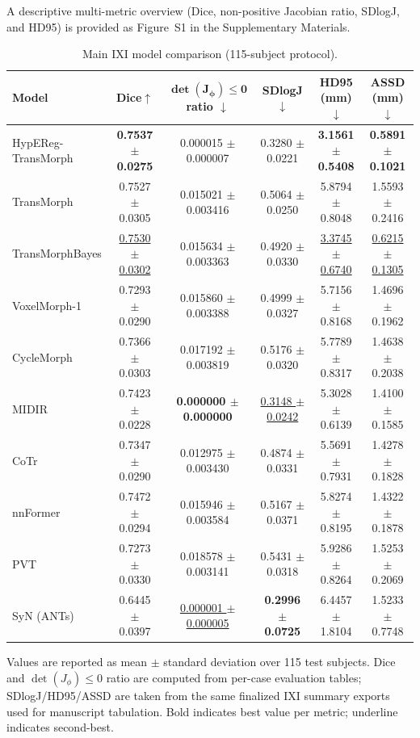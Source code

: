 \documentclass[jimaging,article,submit,pdftex,moreauthors]{Definitions/mdpi}
\begin{document}
\noindent A descriptive multi-metric overview (Dice, non-positive Jacobian ratio, SDlogJ, and HD95) is provided as Figure~S1 in the Supplementary Materials.

\begin{table}[H]
\caption{Main IXI model comparison (115-subject protocol).\label{tab2}}
\centering
\scriptsize
\setlength{\tabcolsep}{3pt}
\begin{tabularx}{\textwidth}{lccccc}
\toprule
\textbf{Model} & \textbf{Dice\(\uparrow\)} & \(\boldsymbol{\det(J_\phi)\le 0}\) \textbf{ratio \(\downarrow\)} & \textbf{SDlogJ\(\downarrow\)} & \textbf{HD95 (mm)\(\downarrow\)} & \textbf{ASSD (mm)\(\downarrow\)}\\
\midrule
HypEReg-TransMorph & \textbf{0.7537 \(\pm\) 0.0275} & 0.000015 \(\pm\) 0.000007 & 0.3280 \(\pm\) 0.0221 & \textbf{3.1561 \(\pm\) 0.5408} & \textbf{0.5891 \(\pm\) 0.1021}\\
TransMorph & 0.7527 \(\pm\) 0.0305 & 0.015021 \(\pm\) 0.003416 & 0.5064 \(\pm\) 0.0250 & 5.8794 \(\pm\) 0.8048 & 1.5593 \(\pm\) 0.2416\\
TransMorphBayes & \underline{0.7530 \(\pm\) 0.0302} & 0.015634 \(\pm\) 0.003363 & 0.4920 \(\pm\) 0.0330 & \underline{3.3745 \(\pm\) 0.6740} & \underline{0.6215 \(\pm\) 0.1305}\\
VoxelMorph-1 & 0.7293 \(\pm\) 0.0290 & 0.015860 \(\pm\) 0.003388 & 0.4999 \(\pm\) 0.0327 & 5.7156 \(\pm\) 0.8168 & 1.4696 \(\pm\) 0.1962\\
CycleMorph & 0.7366 \(\pm\) 0.0303 & 0.017192 \(\pm\) 0.003819 & 0.5176 \(\pm\) 0.0320 & 5.7789 \(\pm\) 0.8317 & 1.4638 \(\pm\) 0.2038\\
MIDIR & 0.7423 \(\pm\) 0.0228 & \textbf{0.000000 \(\pm\) 0.000000} & \underline{0.3148 \(\pm\) 0.0242} & 5.3028 \(\pm\) 0.6139 & 1.4100 \(\pm\) 0.1585\\
CoTr & 0.7347 \(\pm\) 0.0290 & 0.012975 \(\pm\) 0.003430 & 0.4874 \(\pm\) 0.0331 & 5.5691 \(\pm\) 0.7931 & 1.4278 \(\pm\) 0.1828\\
nnFormer & 0.7472 \(\pm\) 0.0294 & 0.015946 \(\pm\) 0.003584 & 0.5167 \(\pm\) 0.0371 & 5.8274 \(\pm\) 0.8195 & 1.4322 \(\pm\) 0.1878\\
PVT & 0.7273 \(\pm\) 0.0330 & 0.018578 \(\pm\) 0.003141 & 0.5431 \(\pm\) 0.0318 & 5.9286 \(\pm\) 0.8264 & 1.5253 \(\pm\) 0.2069\\
SyN (ANTs) & 0.6445 \(\pm\) 0.0397 & \underline{0.000001 \(\pm\) 0.000005} & \textbf{0.2996 \(\pm\) 0.0725} & 6.4457 \(\pm\) 1.8104 & 1.5233 \(\pm\) 0.7748\\
\bottomrule
\end{tabularx}
\parbox{\textwidth}{\footnotesize Values are reported as mean \(\pm\) standard deviation over 115 test subjects. Dice and \(\det(J_\phi)\le 0\) ratio are computed from per-case evaluation tables; SDlogJ/HD95/ASSD are taken from the same finalized IXI summary exports used for manuscript tabulation. Bold indicates best value per metric; underline indicates second-best.}
\end{table}
\end{document}
